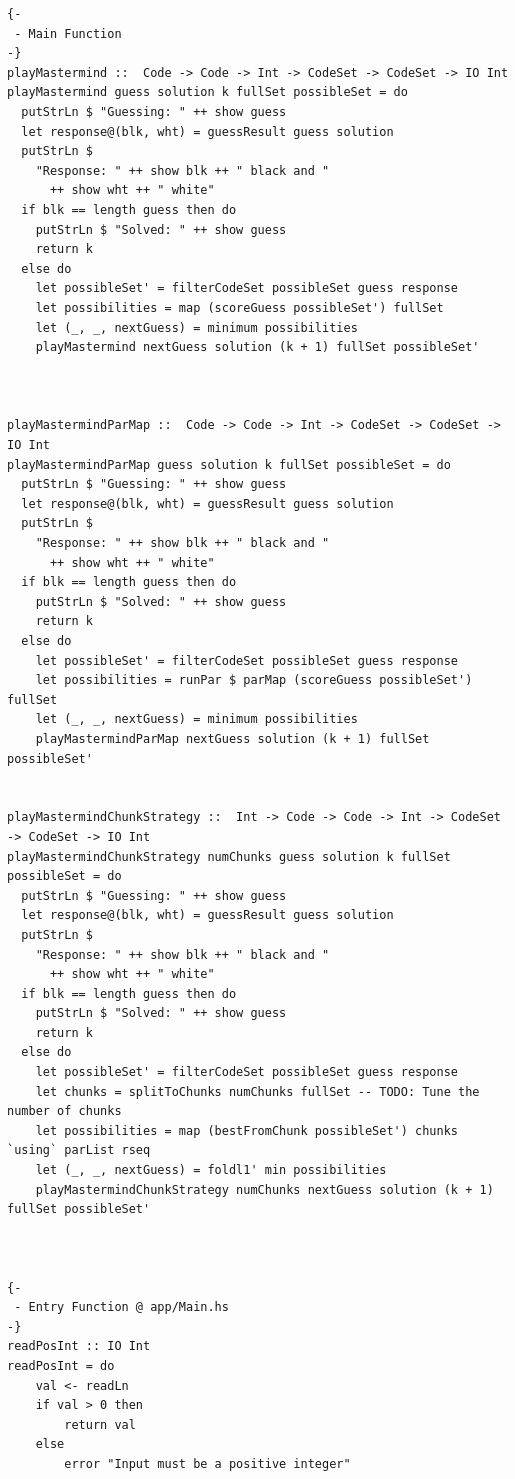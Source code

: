 \documentclass{article}
\begin{document}
\begin{verbatim}
{-
 - Main Function
-}
playMastermind ::  Code -> Code -> Int -> CodeSet -> CodeSet -> IO Int
playMastermind guess solution k fullSet possibleSet = do
  putStrLn $ "Guessing: " ++ show guess
  let response@(blk, wht) = guessResult guess solution
  putStrLn $
    "Response: " ++ show blk ++ " black and "
      ++ show wht ++ " white"
  if blk == length guess then do
    putStrLn $ "Solved: " ++ show guess
    return k
  else do
    let possibleSet' = filterCodeSet possibleSet guess response
    let possibilities = map (scoreGuess possibleSet') fullSet
    let (_, _, nextGuess) = minimum possibilities
    playMastermind nextGuess solution (k + 1) fullSet possibleSet'



playMastermindParMap ::  Code -> Code -> Int -> CodeSet -> CodeSet -> IO Int
playMastermindParMap guess solution k fullSet possibleSet = do
  putStrLn $ "Guessing: " ++ show guess
  let response@(blk, wht) = guessResult guess solution
  putStrLn $
    "Response: " ++ show blk ++ " black and "
      ++ show wht ++ " white"
  if blk == length guess then do
    putStrLn $ "Solved: " ++ show guess
    return k
  else do
    let possibleSet' = filterCodeSet possibleSet guess response
    let possibilities = runPar $ parMap (scoreGuess possibleSet') fullSet
    let (_, _, nextGuess) = minimum possibilities
    playMastermindParMap nextGuess solution (k + 1) fullSet possibleSet'
    
  
playMastermindChunkStrategy ::  Int -> Code -> Code -> Int -> CodeSet -> CodeSet -> IO Int
playMastermindChunkStrategy numChunks guess solution k fullSet possibleSet = do
  putStrLn $ "Guessing: " ++ show guess
  let response@(blk, wht) = guessResult guess solution
  putStrLn $
    "Response: " ++ show blk ++ " black and "
      ++ show wht ++ " white"
  if blk == length guess then do
    putStrLn $ "Solved: " ++ show guess
    return k
  else do
    let possibleSet' = filterCodeSet possibleSet guess response
    let chunks = splitToChunks numChunks fullSet -- TODO: Tune the number of chunks
    let possibilities = map (bestFromChunk possibleSet') chunks `using` parList rseq
    let (_, _, nextGuess) = foldl1' min possibilities
    playMastermindChunkStrategy numChunks nextGuess solution (k + 1) fullSet possibleSet'



{-
 - Entry Function @ app/Main.hs
-}
readPosInt :: IO Int
readPosInt = do
    val <- readLn
    if val > 0 then
        return val
    else
        error "Input must be a positive integer"


\end{verbatim}
\end{document}
